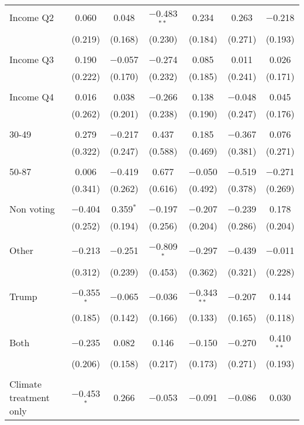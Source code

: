 \begin{tabular}{@{\extracolsep{5pt}}lcccccc}
 Income Q2 & 0.060 & 0.048 & $-$0.483$^{**}$ & 0.234 & 0.263 & $-$0.218 \\ 
  & (0.219) & (0.168) & (0.230) & (0.184) & (0.271) & (0.193) \\ 
  & & & & & & \\ 
 Income Q3 & 0.190 & $-$0.057 & $-$0.274 & 0.085 & 0.011 & 0.026 \\ 
  & (0.222) & (0.170) & (0.232) & (0.185) & (0.241) & (0.171) \\ 
  & & & & & & \\ 
 Income Q4 & 0.016 & 0.038 & $-$0.266 & 0.138 & $-$0.048 & 0.045 \\ 
  & (0.262) & (0.201) & (0.238) & (0.190) & (0.247) & (0.176) \\ 
  & & & & & & \\ 
 30-49 & 0.279 & $-$0.217 & 0.437 & 0.185 & $-$0.367 & 0.076 \\ 
  & (0.322) & (0.247) & (0.588) & (0.469) & (0.381) & (0.271) \\ 
  & & & & & & \\ 
 50-87 & 0.006 & $-$0.419 & 0.677 & $-$0.050 & $-$0.519 & $-$0.271 \\ 
  & (0.341) & (0.262) & (0.616) & (0.492) & (0.378) & (0.269) \\ 
  & & & & & & \\ 
 Non voting & $-$0.404 & 0.359$^{*}$ & $-$0.197 & $-$0.207 & $-$0.239 & 0.178 \\ 
  & (0.252) & (0.194) & (0.256) & (0.204) & (0.286) & (0.204) \\ 
  & & & & & & \\ 
 Other & $-$0.213 & $-$0.251 & $-$0.809$^{*}$ & $-$0.297 & $-$0.439 & $-$0.011 \\ 
  & (0.312) & (0.239) & (0.453) & (0.362) & (0.321) & (0.228) \\ 
  & & & & & & \\ 
 Trump & $-$0.355$^{*}$ & $-$0.065 & $-$0.036 & $-$0.343$^{**}$ & $-$0.207 & 0.144 \\ 
  & (0.185) & (0.142) & (0.166) & (0.133) & (0.165) & (0.118) \\ 
  & & & & & & \\ 
 Both & $-$0.235 & 0.082 & 0.146 & $-$0.150 & $-$0.270 & 0.410$^{**}$ \\ 
  & (0.206) & (0.158) & (0.217) & (0.173) & (0.271) & (0.193) \\ 
  & & & & & & \\ 
 Climate treatment only & $-$0.453$^{*}$ & 0.266 & $-$0.053 & $-$0.091 & $-$0.086 & 0.030 \\ 

\end{tabular}
